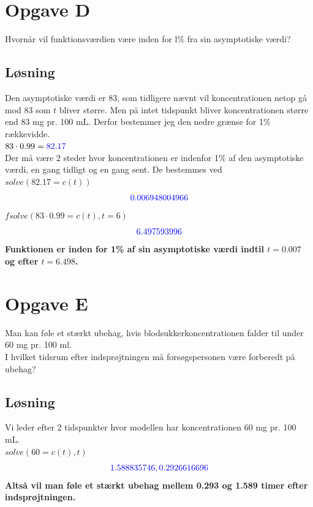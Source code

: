 \documentclass[a4paper, 11pt]{article}
\begin{document}
\section*{Opgave D} 
Hvornår vil funktionsværdien være inden for l\% fra sin asymptotiske værdi?
\subsection*{Løsning}
Den asymptotiske værdi er 83, som tidligere nævnt vil koncentrationen netop gå mod 83 som \(t\) bliver større. 
Men på intet tidspunkt bliver koncentrationen større end 83 mg pr. 100 mL. Derfor bestemmer jeg den nedre grænse for 1\% rækkevidde.\\ 
\(83 \cdot 0.99 = \textcolor{blue}{82.17}\)\\
Der må være 2 steder hvor koncentrationen er indenfor 1\% af den asymptotiske værdi, en gang tidligt og en gang sent. De bestemmes ved\\
\(solve(82.17=c(t))\)
\[\textcolor{blue}{0.006948004966}\]
\(\mathit{fsolve}\left(83\cdot  0.99=c\left(t\right),t=6\right)\)
\[\textcolor{blue}{6.497593996}\]
\textbf{Funktionen er inden for 1\% af sin asymptotiske værdi indtil \(t=0.007\) og efter \(t=6.498\).}
\section*{Opgave E} 
Man kan føle et stærkt ubehag, hvis blodsukkerkoncentrationen falder til under 60 mg pr. 100 ml. \\
I hvilket tidsrum efter indsprøjtningen må forsøgspersonen være forberedt på ubehag?
\subsection*{Løsning}
Vi leder efter 2 tidspunkter hvor modellen har koncentrationen 60 mg pr. 100 mL. \\
\(solve(60 = c(t),t)\)
\[\textcolor{blue}{ 1.588835746, 0.2926616696}\]
\textbf{Altså vil man føle et stærkt ubehag mellem 0.293 og 1.589 timer efter indsprøjtningen.}
\end{document}
